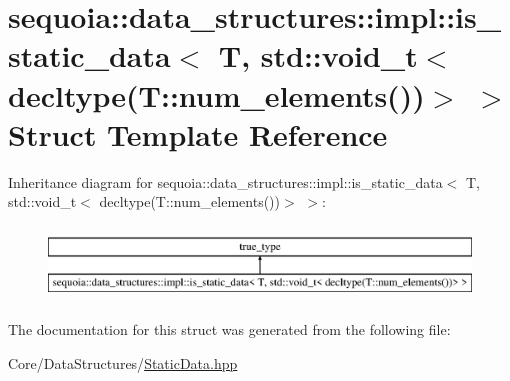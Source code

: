 \hypertarget{structsequoia_1_1data__structures_1_1impl_1_1is__static__data_3_01_t_00_01std_1_1void__t_3_01dec9100e6cc225ffc56030663b1708fc128}{}\section{sequoia\+::data\+\_\+structures\+::impl\+::is\+\_\+static\+\_\+data$<$ T, std\+::void\+\_\+t$<$ decltype(T\+::num\+\_\+elements())$>$ $>$ Struct Template Reference}
\label{structsequoia_1_1data__structures_1_1impl_1_1is__static__data_3_01_t_00_01std_1_1void__t_3_01dec9100e6cc225ffc56030663b1708fc128}
Inheritance diagram for sequoia\+::data\+\_\+structures\+::impl\+::is\+\_\+static\+\_\+data$<$ T, std\+::void\+\_\+t$<$ decltype(T\+::num\+\_\+elements())$>$ $>$\+:\begin{figure}[H]
\begin{center}
\leavevmode
\includegraphics[height=2.000000cm]{structsequoia_1_1data__structures_1_1impl_1_1is__static__data_3_01_t_00_01std_1_1void__t_3_01dec9100e6cc225ffc56030663b1708fc128}
\end{center}
\end{figure}


The documentation for this struct was generated from the following file\+:\begin{DoxyCompactItemize}
\item 
Core/\+Data\+Structures/\mbox{\hyperlink{_static_data_8hpp}{Static\+Data.\+hpp}}\end{DoxyCompactItemize}

